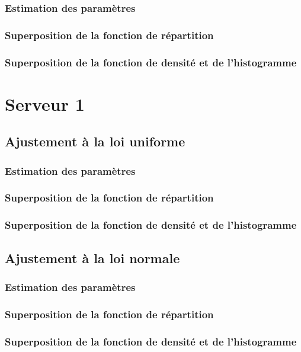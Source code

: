 \documentclass{article}
\begin{document}
\subsubsection{Estimation des paramètres}
\subsubsection{Superposition de la fonction de répartition}
\subsubsection{Superposition de la fonction de densité et de l'histogramme}

\section{Serveur 1}

\subsection{Ajustement à la loi uniforme}

\subsubsection{Estimation des paramètres}
\subsubsection{Superposition de la fonction de répartition}
\subsubsection{Superposition de la fonction de densité et de l'histogramme}

\subsection{Ajustement à la loi normale}

\subsubsection{Estimation des paramètres}
\subsubsection{Superposition de la fonction de répartition}
\subsubsection{Superposition de la fonction de densité et de l'histogramme}
\end{document}
